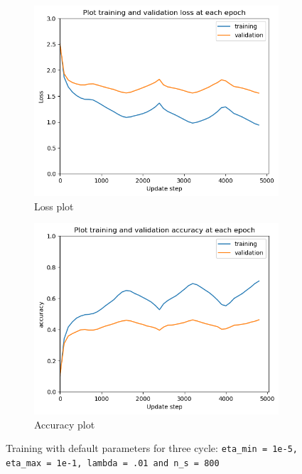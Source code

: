 \documentclass[12pt]{article}
\newenvironment{question}[2][Question]{\begin{trivlist}
\kern10pt
\item[\hskip \labelsep {\bfseries #1}\hskip \labelsep {\bfseries #2.}]}{\end{trivlist}}
\begin{document}
\begin{question}{ii}
\begin{figure}[!htb]
    \hfill
    \begin{subfigure}[b]{0.32\textwidth}
        \includegraphics[width=\linewidth]{f4_loss_plt.png}
        \caption{Loss plot}
    \end{subfigure}\hfill
    \begin{subfigure}[b]{0.32\textwidth}%
        \includegraphics[width=\linewidth]{f4_acc_plt.png}
        \caption{Accuracy plot}
    \end{subfigure}
    \caption{
        Training with default parameters for three cycle:
        \texttt{eta\_min = 1e-5, eta\_max = 1e-1,  lambda = .01 and n\_s = 800}
    }
    \label{fig:replicate_f4}
\end{figure}
\end{question}
\end{document}
